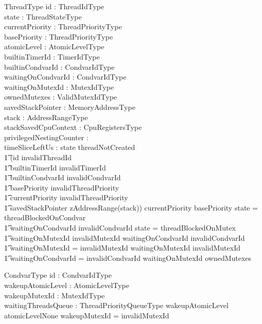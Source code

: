 \documentclass[11pt,letterpaper,twoside,openany]{book}
\begin{document}
\begin{schema}{ThreadType}
   id : ThreadIdType \\
   state : ThreadStateType \\
   currentPriority : ThreadPriorityType \\
   basePriority : ThreadPriorityType \\
   atomicLevel : AtomicLevelType \\
   builtinTimerId : TimerIdType \\
   builtinCondvarId : CondvarIdType \\
   waitingOnCondvarId : CondvarIdType \\
   waitingOnMutexId : MutexIdType \\
   ownedMutexes : \iseq ValidMutexIdType \\
   savedStackPointer : MemoryAddressType \\
   stack : AddressRangeType \\
   stackSavedCpuContext : CpuRegistersType \\
   privilegedNestingCounter : \nat \\
   timeSliceLeftUs : \nat
\where
   state \neq threadNotCreated \implies \\
   \t1 (id \neq invalidThreadId \land \\
   \t1 builtinTimerId \neq invalidTimerId \land \\
   \t1 builtinCondvarId \neq invalidCondvarId \land \\
   \t1 basePriority \neq invalidThreadPriority \land \\
   \t1 currentPriority \neq invalidThreadPriority \land \\
   \t1 savedStackPointer \in zAddressRange(stack))
\also
   currentPriority \geq basePriority
\also
   state = threadBlockedOnCondvar \iff \\
   \t1 waitingOnCondvarId \neq invalidCondvarId
\also
   state = threadBlockedOnMutex \iff \\
   \t1  waitingOnMutexId \neq invalidMutexId
\also
   waitingOnCondvarId \neq invalidCondvarId \implies \\
   \t1 waitingOnMutexId = invalidMutexId
\also
   waitingOnMutexId \neq invalidMutexId \implies \\
   \t1 waitingOnCondvarId = invalidCondvarId
\also
   waitingOnMutexId \notin \ran ownedMutexes
\end{schema}

\begin{schema}{CondvarType}
   id : CondvarIdType \\
   wakeupAtomicLevel : AtomicLevelType \\
   wakeupMutexId : MutexIdType \\
   waitingThreadsQueue : ThreadPriorityQueueType
\where
   wakeupAtomicLevel \neq atomicLevelNone \implies wakeupMutexId = invalidMutexId
\end{schema}
\end{document}
